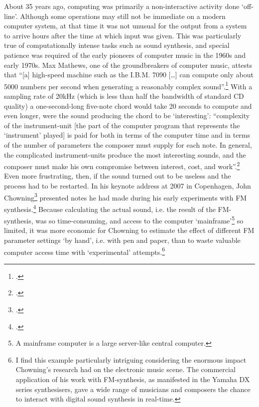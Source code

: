\label{sec:interaction-time:2}
About 35 years ago, computing was primarily a non-interactive activity done `off-line'. Although some operations may still not be immediate on a modern computer system, at that time it was not unusual for the output from a system to arrive hours after the time at which input was given. This was particularly true of computationally intense tasks such as sound synthesis, and special patience was required of the early pioneers of computer music in the  1960s and early 1970s. Max Mathews, one of the groundbreakers of computer music, attests that ``[a] high-speed machine such as the I.B.M. 7090 [\ldots] can compute only about 5000 numbers per second when generating a reasonably complex sound''.\footcite[553]{mathews63} With a sampling rate of 20kHz (which is less than half the bandwidth of standard CD quality) a one-second-long five-note chord would take 20 seconds to compute and even longer, were the sound producing the chord to be `interesting': ``complexity of the instrument-unit [the part of the computer program that represents the `instrument' played] is paid for both in terms of the computer time and in terms of the number of parameters the composer must supply for each note. In general, the complicated instrument-units produce the most interesting sounds, and the composer must make his own compromise between interest, cost, and work''.\footcite[555]{mathews63} Even more frustrating, then, if the sound turned out to be useless and the process had to be restarted. In his keynote address at  2007 in Copenhagen, John Chowning\footcite{chowning07} presented notes he had made during his early experiments with FM synthesis.\footcite[Frequency Modulation synthesis. See][]{chowning73} Because calculating the actual sound, i.e. the result of the FM-synthesis, was so time-consuming, and access to the computer `mainframe'\footnote{A mainframe computer is a large server-like central computer.} so limited, it was more economic for Chowning to estimate the effect of different FM parameter settings `by hand', i.e. with pen and paper, than to waste valuable computer access time with `experimental' attempts.\footnote{I find this example  particularly intriguing considering the enormous impact Chowning's research had on the electronic music scene. The commercial application of his work with FM-synthesis, as manifested in the Yamaha DX series synthesisers, gave a wide range of musicians and composers the chance to interact with digital sound synthesis in real-time.}

